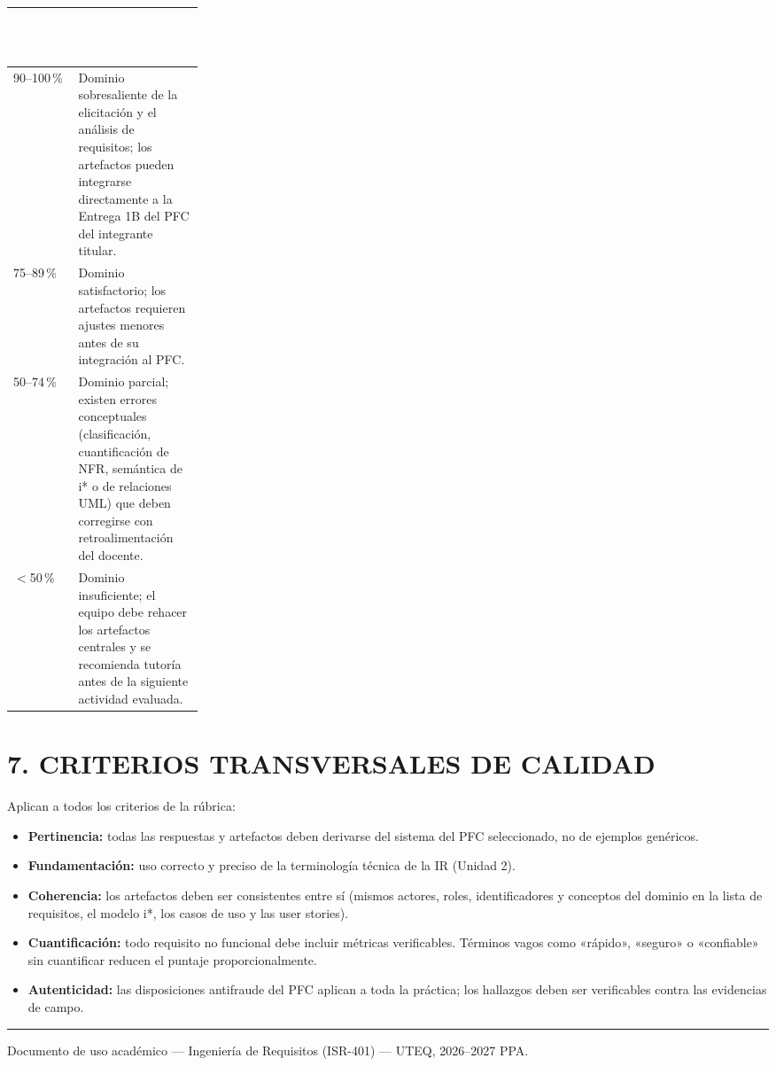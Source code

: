 \documentclass[11pt]{article}
\newcommand{\thdr}[1]{\cellcolor{utegreen}\textcolor{white}{\textbf{#1}}}
\begin{document}
\noindent\begin{tabularx}{\linewidth}{|C{0.25\linewidth}|X|}
\hline
\thdr{Banda (\% del puntaje)} & \thdr{Interpretación}\\
\hline
{}90--100\,\% & Dominio sobresaliente de la elicitación y el análisis de requisitos; los artefactos pueden integrarse directamente a la Entrega 1B del PFC del integrante titular.\\
\hline
{}75--89\,\% & Dominio satisfactorio; los artefactos requieren ajustes menores antes de su integración al PFC.\\
\hline
{}50--74\,\% & Dominio parcial; existen errores conceptuales (clasificación, cuantificación de NFR, semántica de i* o de relaciones UML) que deben corregirse con retroalimentación del docente.\\
\hline
{}$<$50\,\% & Dominio insuficiente; el equipo debe rehacer los artefactos centrales y se recomienda tutoría antes de la siguiente actividad evaluada.\\
\hline
\end{tabularx}

\section*{\textcolor{utegreendk}{7. CRITERIOS TRANSVERSALES DE CALIDAD}}

\begin{tcolorbox}[colback=boxgray,colframe=utegreen,boxrule=0.8pt,arc=2mm]
Aplican a todos los criterios de la rúbrica:
\begin{itemize}[leftmargin=18pt,itemsep=2pt]
  \item \textbf{Pertinencia:} todas las respuestas y artefactos deben derivarse del sistema del PFC seleccionado, no de ejemplos genéricos.
  \item \textbf{Fundamentación:} uso correcto y preciso de la terminología técnica de la IR (Unidad 2).
  \item \textbf{Coherencia:} los artefactos deben ser consistentes entre sí (mismos actores, roles, identificadores y conceptos del dominio en la lista de requisitos, el modelo i*, los casos de uso y las user stories).
  \item \textbf{Cuantificación:} todo requisito no funcional debe incluir métricas verificables. Términos vagos como «rápido», «seguro» o «confiable» sin cuantificar reducen el puntaje proporcionalmente.
  \item \textbf{Autenticidad:} las disposiciones antifraude del PFC aplican a toda la práctica; los hallazgos deben ser verificables contra las evidencias de campo.
\end{itemize}
\end{tcolorbox}

\vspace{10pt}
\noindent\textcolor{gold}{\rule{\linewidth}{1.5pt}}
\begin{center}
\footnotesize Documento de uso académico --- Ingeniería de Requisitos (ISR-401) --- UTEQ, 2026--2027 PPA.
\end{center}
\end{document}
